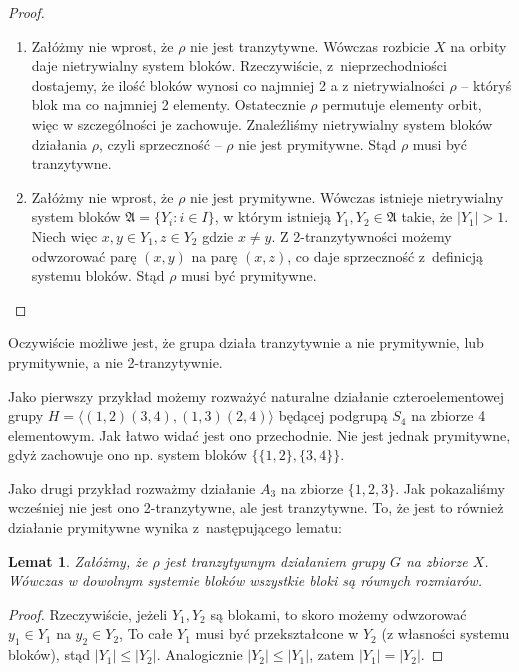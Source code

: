 \documentclass[licencjacka]{pracamgr}
\newtheorem{lemma}{Lemat}[section]
\begin{document}
\begin{proof}%
	\begin{enumerate}[label=Ad \alph*)] 
	 \item 	Załóżmy nie wprost, że $\rho$ nie jest tranzytywne. 
					Wówczas rozbicie $X$ na orbity daje nietrywialny system bloków.
					Rzeczywiście, z~nieprzechodniości dostajemy, że ilość bloków wynosi co najmniej 2 a
					z nietrywialności $\rho$ -- któryś blok ma co najmniej 2 elementy.
					Ostatecznie $\rho$ permutuje elementy orbit, więc w szczególności je zachowuje.
					Znaleźliśmy nietrywialny system bloków działania $\rho$, czyli sprzeczność -- $\rho$ nie jest prymitywne.
					Stąd $\rho$ musi być tranzytywne.
	 \item 	Załóżmy nie wprost, że $\rho$ nie jest prymitywne.
					Wówczas istnieje nietrywialny system bloków $\mathfrak{A} = \{Y_i \colon i \in I \}$, 
					w którym istnieją $Y_1, Y_2 \in \mathfrak{A}$ takie, że $|Y_1| > 1$.
					Niech więc $x,y \in Y_1, z \in Y_2$ gdzie $x \ne y$.
					Z 2-tranzytywności możemy odwzorować parę $(x, y)$ na parę $(x, z)$, co daje sprzeczność z~definicją systemu bloków.
					Stąd $\rho$ musi być prymitywne.
	\end{enumerate}
\end{proof}

Oczywiście możliwe jest, że grupa działa tranzytywnie a nie prymitywnie, lub prymitywnie, a nie 2-tranzytywnie.

Jako pierwszy przykład możemy rozważyć naturalne działanie czteroelementowej 
grupy $H= \langle (1,2)(3,4), (1,3)(2,4) \rangle$ będącej podgrupą $S_4$ na zbiorze 4 elementowym.
Jak łatwo widać jest ono przechodnie.
Nie jest jednak prymitywne, gdyż zachowuje ono np. system bloków $\{\{1,2\}, \{3,4\}\}$.

Jako drugi przykład rozważmy działanie $A_3$ na zbiorze $\{1, 2, 3\}$.
Jak pokazaliśmy wcześniej nie jest ono 2-tranzytywne, ale jest tranzytywne.
To, że jest to również działanie prymitywne wynika z~następującego lematu:

\begin{lemma}
	Załóżmy, że $\rho$ jest tranzytywnym działaniem grupy $G$ na zbiorze $X$.
	Wówczas w dowolnym systemie bloków wszystkie bloki są równych rozmiarów.
\end{lemma}
\begin{proof}
Rzeczywiście, jeżeli $Y_1, Y_2$ są blokami, to skoro możemy odwzorować $y_1 \in Y_1$ na $y_2 \in Y_2$, 
To całe $Y_1$ musi być przekształcone w $Y_2$ (z własności systemu bloków), stąd $|Y_1| \le |Y_2|$.
Analogicznie $|Y_2| \le |Y_1|$, zatem $|Y_1| = |Y_2|$.
\end{proof}
\end{document}
